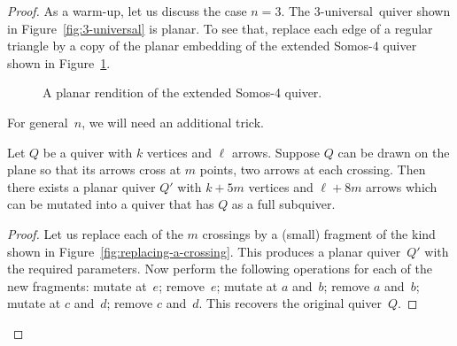 \documentclass[ALCO,ThmDefs,Unicode,epreuves,published]{cedram}
\begin{document}
\begin{proof}
As a warm-up, let us discuss the case $n=3$. %
The 3-universal~quiver shown in Figure~\ref{fig:3-universal} is planar. 
To see that, replace each edge of a regular triangle by a copy of the planar embedding of the extended Somos-4 quiver shown in Figure~\ref{fig:flattened-Somos-4}.

\begin{figure}[ht]\centering
{}

\caption{A planar rendition of the extended Somos-4 quiver. }
\label{fig:flattened-Somos-4}
\end{figure}


For general~$n$, we will need an additional trick. 

\begin{lemma}
\label{lem:resolving-crossings}
Let $Q$ be a quiver with $k$ vertices and $\ell$ arrows.
Suppose $Q$ can be drawn on the plane so that its arrows cross at $m$ points, two arrows at each crossing. Then there exists a planar quiver $Q'$ with $k+5m$ vertices and $\ell+8m$ arrows which can be mutated into a quiver that has $Q$ as a full subquiver. 
\end{lemma}

\begin{proof}
Let us replace each of the $m$ crossings by a (small) fragment of the kind shown in Figure~\ref{fig:replacing-a-crossing}. 
This produces a planar quiver~$Q'$ with the required parameters. Now perform the following operations for each of the new fragments: 
mutate at~$e$; remove~$e$; 
mutate at $a$ and~$b$; remove $a$ and~$b$;
mutate at $c$ and~$d$; remove $c$ and~$d$. 
This recovers the original quiver~$Q$. 
\end{proof}


\end{proof}
\end{document}
